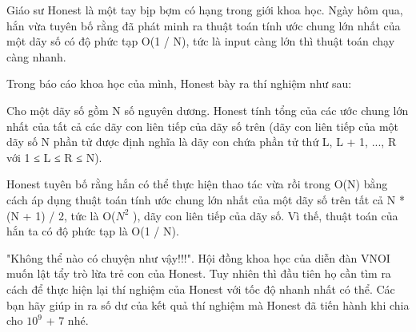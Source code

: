 Giáo sư Honest là một tay bịp bợm có hạng trong giới khoa học. Ngày hôm qua, hắn vừa tuyên bố rằng đã phát minh ra thuật toán tính ước chung lớn nhất của một dãy số có độ phức tạp O(1 / N), tức là input càng lớn thì thuật toán chạy càng nhanh.  

   Trong báo cáo khoa học của mình, Honest bày ra thí nghiệm như sau:  

Cho một dãy số gồm N số nguyên dương. Honest tính tổng của các ước chung lớn nhất của tất cả các dãy con liên tiếp của dãy số trên (dãy con liên tiếp của một dãy số N phần tử được định nghĩa là dãy con chứa phần tử thứ L, L + 1, ..., R với 1 ≤ L ≤ R ≤ N).

   Honest tuyên bố rằng hắn có thể thực hiện thao tác vừa rồi trong O(N) bằng cách áp dụng thuật toán tính ước chung lớn nhất của một dãy số trên tất cả N * (N + 1) / 2, tức là O($N^{2}$   ), dãy con liên tiếp của dãy số. Vì thế, thuật toán của hắn ta có độ phức tạp là O(1 / N).  

   "Không thể nào có chuyện như vậy!!!". Hội đồng khoa học của diễn đàn VNOI muốn lật tẩy trò lừa trẻ con của Honest. Tuy nhiên thì đầu tiên họ cần tìm ra cách để thực hiện lại thí nghiệm của Honest với tốc độ nhanh nhất có thể. Các bạn hãy giúp in ra số dư của kết quả thí nghiệm mà Honest đã tiến hành khi chia cho $10^{9}$   + 7 nhé.